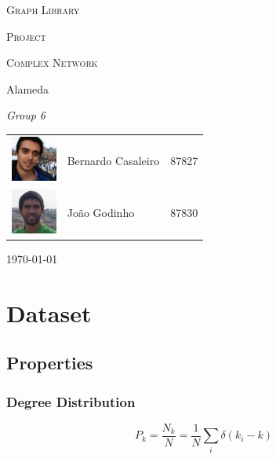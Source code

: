 \documentclass[a4paper,titlepage,11pt]{article}
\begin{document}
\begin{titlepage}
  \begin{center}
    {\scshape \huge Graph Library \par}
    \vspace{1cm}

    {\scshape \LARGE Project \par}
    \vspace{1.5cm}

    {\scshape \Large Complex Network \par}
    \vspace{0.5cm}

    {\Large Alameda \par}
    \vfill

    {\itshape \Large Group 6 \par}
    \vfill

    \begin{tabular}{l l l}
      \includegraphics[width=15mm, height=15mm]{img/bernardo.jpeg} & Bernardo Casaleiro & 87827\\
      \includegraphics[width=15mm, height=15mm]{img/joao.jpeg} & João Godinho & 87830\\
    \end{tabular}
    \vfill

    {\large \today\par}
  \end{center}
\end{titlepage}







\section{Dataset}
\subsection{Properties}
\subsubsection{Degree Distribution}
\[
  P_k = \frac{N_k}{N} = \frac{1}{N}\sum_{i}{\delta(k_i-k)}
\]
\end{document}
